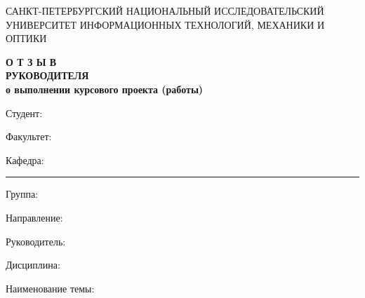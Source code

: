 \thispagestyle{empty}


\begin{center}
{\small САНКТ-ПЕТЕРБУРГСКИЙ НАЦИОНАЛЬНЫЙ ИССЛЕДОВАТЕЛЬСКИЙ УНИВЕРСИТЕТ ИНФОРМАЦИОННЫХ ТЕХНОЛОГИЙ, МЕХАНИКИ И ОПТИКИ}

\textbf{О Т З Ы В
\\
	РУКОВОДИТЕЛЯ\\
	о выполнении курсового проекта (работы)
}
\end{center}

Студент:  

Факультет: 

Кафедра: \rule{10em}{.1pt} Группа: 

Направление:  

Руководитель: 

Дисциплина: 

\hrulefill

Наименование темы: 

\hrulefill

